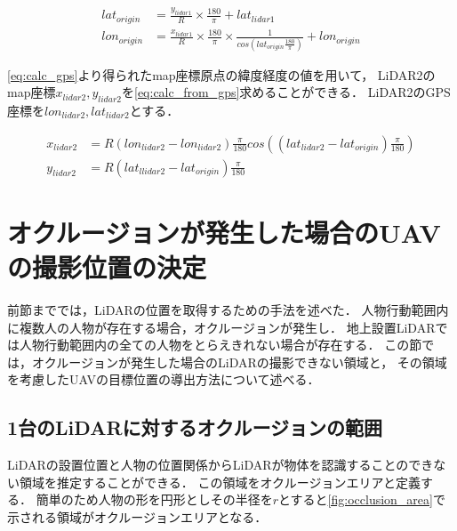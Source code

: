 \documentclass[autodetect-engine,dvipdfmx-if-dvi,ja=standard,a4j,jbase=11pt,magstyle=nomag*]{bxjsreport}
\begin{document}
\begin{equation}
    \begin{aligned}
        lat_{origin} &= \frac{y_{lidar1}}{R} \times \frac{180}{\pi} + lat_{lidar1}\\
        lon_{origin} &= \frac{x_{lidar1}}{R} \times \frac{180}{\pi} \times \frac{1}{cos( lat_{origin} \frac{180}{\pi})} + lon_{origin}
    \end{aligned}
    \label{eq:calc_gps}
\end{equation}

\cref{eq:calc_gps}より得られたmap座標原点の緯度経度の値を用いて，
LiDAR2のmap座標$x_{lidar2}, y_{lidar2}$を\cref{eq:calc_from_gps}求めることができる．
LiDAR2のGPS座標を$lon_{lidar2}, lat_{lidar2}$とする．

\begin{equation}
    \begin{aligned}
        x_{lidar2} &=  R ( lon_{lidar2} - lon_{lidar2} ) \frac{\pi}{180} cos(( lat_{lidar2} - lat_{origin} )\frac{\pi}{180}) \\
        y_{lidar2} &=  R ( lat_{llidar2} - lat_{origin} ) \frac{\pi}{180}
    \end{aligned}
    \label{eq:calc_from_gps}
\end{equation}

\section{オクルージョンが発生した場合のUAVの撮影位置の決定}
前節まででは，LiDARの位置を取得するための手法を述べた．
人物行動範囲内に複数人の人物が存在する場合，オクルージョンが発生し．
地上設置LiDARでは人物行動範囲内の全ての人物をとらえきれない場合が存在する．
この節では，オクルージョンが発生した場合のLiDARの撮影できない領域と，
その領域を考慮したUAVの目標位置の導出方法について述べる．

\subsection{1台のLiDARに対するオクルージョンの範囲}
LiDARの設置位置と人物の位置関係からLiDARが物体を認識することのできない領域を推定することができる．
この領域をオクルージョンエリアと定義する．
簡単のため人物の形を円形としその半径を$r$とすると\cref{fig:occlusion_area}で示される領域がオクルージョンエリアとなる．
\end{document}
